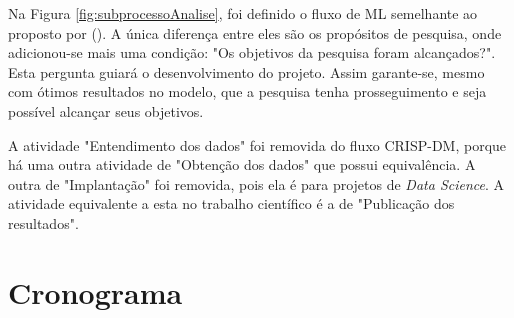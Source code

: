 Na Figura \ref{fig:subprocessoAnalise}, foi definido o fluxo de ML semelhante ao proposto por \citeauthor{BRINK2015} (\citeyear{BRINK2015}). A única diferença entre eles são os propósitos de pesquisa, onde adicionou-se mais uma condição: "Os objetivos da pesquisa foram alcançados?". Esta pergunta guiará o desenvolvimento do projeto. Assim garante-se, mesmo com ótimos resultados no modelo, que a pesquisa tenha prosseguimento e seja possível alcançar seus objetivos.

A atividade "Entendimento dos dados" foi removida do fluxo CRISP-DM, porque há uma outra atividade de "Obtenção dos dados" que possui equivalência. A outra de "Implantação" foi removida, pois ela é para projetos de \textit{Data Science}. A atividade equivalente a esta no trabalho científico é a de "Publicação dos resultados".

\section{Cronograma}

